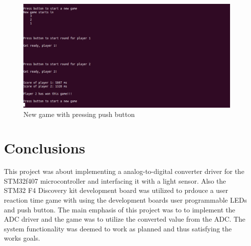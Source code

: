 \begin{figure}[htbp]
  \centering
     \includegraphics[width=1\textwidth]{./figures/Game_demo3.png}
  \caption{New game with pressing push button}
  \label{fig:second_game_run}
\end{figure}

\pagebreak


\section{Conclusions}
This project was about implementing a analog-to-digital converter driver for the STM32f407 microcontroller and interfacing it with a light sensor. Also the STM32 F4 Discovery kit development board was utilized to prdouce a user reaction time game with using the development boards user programmable LEDs and push button. The main emphasis of this project was to to implement the ADC driver and the game was to utilize the converted value from the ADC. The system functionality was deemed to work as planned and thus satisfying the works goals.
